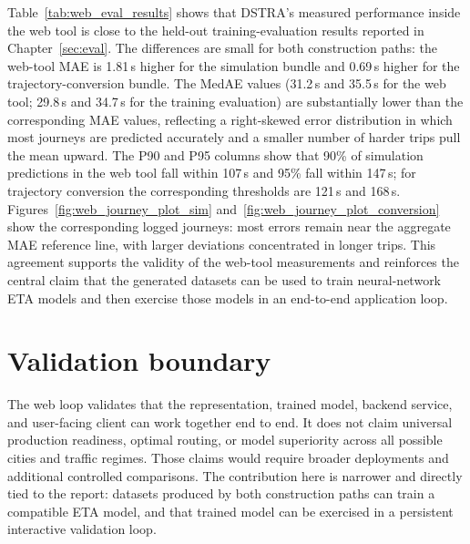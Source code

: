 Table~\ref{tab:web_eval_results} shows that DSTRA's measured performance inside the web tool is close to the held-out training-evaluation results reported in Chapter~\ref{sec:eval}. The differences are small for both construction paths: the web-tool MAE is 1.81\,s higher for the simulation bundle and 0.69\,s higher for the trajectory-conversion bundle. The MedAE values (31.2\,s and 35.5\,s for the web tool; 29.8\,s and 34.7\,s for the training evaluation) are substantially lower than the corresponding MAE values, reflecting a right-skewed error distribution in which most journeys are predicted accurately and a smaller number of harder trips pull the mean upward. The P90 and P95 columns show that 90\% of simulation predictions in the web tool fall within 107\,s and 95\% fall within 147\,s; for trajectory conversion the corresponding thresholds are 121\,s and 168\,s. Figures~\ref{fig:web_journey_plot_sim} and~\ref{fig:web_journey_plot_conversion} show the corresponding logged journeys: most errors remain near the aggregate MAE reference line, with larger deviations concentrated in longer trips. This agreement supports the validity of the web-tool measurements and reinforces the central claim that the generated datasets can be used to train neural-network ETA models and then exercise those models in an end-to-end application loop.

\section{Validation boundary}
The web loop validates that the representation, trained model, backend service, and user-facing client can work together end to end. It does not claim universal production readiness, optimal routing, or model superiority across all possible cities and traffic regimes. Those claims would require broader deployments and additional controlled comparisons. The contribution here is narrower and directly tied to the report: datasets produced by both construction paths can train a compatible ETA model, and that trained model can be exercised in a persistent interactive validation loop.

\FloatBarrier
